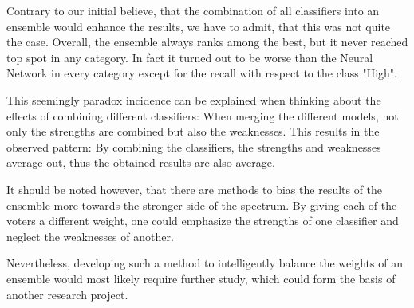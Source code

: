 Contrary to our initial believe, that the combination of all
classifiers into an ensemble would enhance the results, we have to
admit, that this was not quite the case. Overall, the ensemble always
ranks among the best, but it never reached top spot in any
category. In fact it turned out to be worse than the Neural Network in
every category except for the recall with respect to the class "High".

This seemingly paradox incidence can be explained when
thinking about the effects of combining different classifiers: When
merging the different models, not only the strengths are combined but
also the weaknesses. This results in the observed pattern: By
combining the classifiers, the strengths and weaknesses average out,
thus the obtained results are also average.

It should be noted however, that there are methods to bias the results
of the ensemble more towards the stronger side of the spectrum.
By giving each of the voters a different weight, one could emphasize the
strengths of one classifier and neglect the weaknesses of
another.

\noindent Nevertheless, developing such a method to intelligently balance the weights of an
ensemble would most likely require further study, which
could form the basis of another research project.
